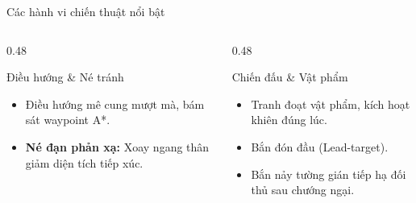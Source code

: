 \documentclass[aspectratio=169]{beamer}
\begin{document}
\begin{frame}{Các hành vi chiến thuật nổi bật}
  \begin{columns}[T]
    \begin{column}{0.48\textwidth}
      \begin{block}{Điều hướng \& Né tránh}
        \begin{itemize}
          \item Điều hướng mê cung mượt mà, bám sát waypoint A*.
          \item \textbf{Né đạn phản xạ:} Xoay ngang thân giảm diện tích tiếp xúc.
        \end{itemize}
      \end{block}
    \end{column}
    \begin{column}{0.48\textwidth}
      \begin{block}{Chiến đấu \& Vật phẩm}
        \begin{itemize}
          \item Tranh đoạt vật phẩm, kích hoạt khiên đúng lúc.
          \item Bắn đón đầu (Lead-target).
          \item Bắn nảy tường gián tiếp hạ đối thủ sau chướng ngại.
        \end{itemize}
      \end{block}
    \end{column}
  \end{columns}
\end{frame}
\end{document}
